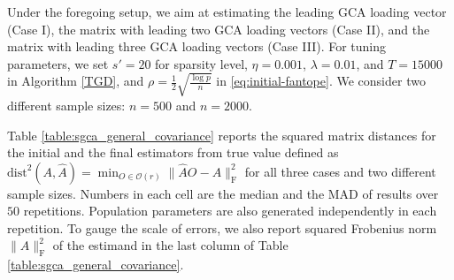 \documentclass[11pt]{article}
\newcommand{\0}{{\mathbf{0}}}
\begin{document}
Under the foregoing setup, we aim at estimating the leading GCA loading vector (Case I), the matrix with leading two GCA loading vectors (Case II), and the matrix with leading three GCA loading vectors (Case III). 
For tuning parameters, we set  $s'=20$ for sparsity level, 
 $\eta=0.001$, $\lambda = 0.01$, and $T=15000$ in Algorithm \ref{TGD}, and
$\rho = \frac{1}{2}\sqrt{\frac{\log p}{n}}$ in \eqref{eq:initial-fantope}. 
We consider two different sample sizes: $n=500$ and $n=2000$.

Table \ref{table:sgca_general_covariance} reports the squared matrix distances for the initial and the final estimators from true value defined as $\mathrm{dist}^2(A,\widehat{A}) = \min_{O\in\mathcal{O}(r)}\|\widehat{A}O-A\|_\mathrm{F}^2$ for all three cases and two different sample sizes.
Numbers in each cell are the median and the MAD of results over $50$ repetitions. Population parameters are also generated independently in each repetition.
To gauge the scale of errors, we also report squared Frobenius norm $\|A\|_\mathrm{F}^2$ of the estimand in the last column of Table \ref{table:sgca_general_covariance}.
\end{document}
